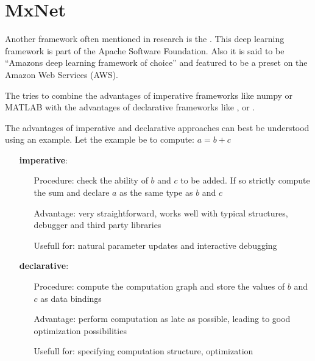 
\section{MxNet}\label{sec: MxNet}

Another framework often mentioned in research is the \mxnet. This deep learning framework is part of the Apache Software Foundation. Also it is said to be ``Amazons deep learning framework of choice'' \cite{infoworld} and featured to be a preset on the Amazon Web Services (AWS). \cite{chenmxnet}

The \mxnet tries to combine the advantages of imperative frameworks like numpy or MATLAB with the advantages of declarative frameworks like \caffe, \caffetwo or \tensorflow.

The advantages of imperative and declarative approaches can best be understood using an example.
Let the example be to compute: $a = b+c$
\begin{itemize}
	\item[] \textbf{imperative}:
		\begin{itemize}
			\setlength{\itemindent}{1.5 cm}
			\item[Procedure:] check the ability of $b$ and $c$ to be added. If so strictly compute the sum and declare $a$ as the same type as $b$ and $c$
			\item[Advantage:] very straightforward, works well with typical structures, debugger and third party libraries
			\item[Usefull for:] natural parameter updates and interactive debugging
		\end{itemize}
	\item[] \textbf{declarative}:
		\begin{itemize}
			\setlength{\itemindent}{1.5cm}
			\item[Procedure:] compute the computation graph and store the values of $b$ and $c$ as data bindings
			\item[Advantage:] perform computation as late as possible, leading to good optimization possibilities
			\item[Usefull for:] specifying computation structure, optimization
		\end{itemize}
\end{itemize}

